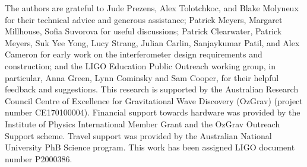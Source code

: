 \documentclass[aps,pra,superscriptaddress,reprint,nofootinbib]{revtex4-1}
\begin{document}
\begin{acknowledgments}
The authors are grateful to Jude Prezens, Alex Tolotchkoc, and Blake Molyneux for their technical advice and generous assistance; Patrick Meyers, Margaret Millhouse, Sofia Suvorova for useful discussions; Patrick Clearwater, Patrick Meyers, Suk Yee Yong, Lucy Strang, Julian Carlin, Sanjaykumar Patil, and Alex Cameron for early work on the interferometer design requirements and construction; and the LIGO Education Public Outreach working group, in particular, Anna Green, Lynn Cominsky and Sam Cooper, for their helpful feedback and suggestions.  
This research is supported by the Australian Research Council Centre of Excellence for Gravitational Wave Discovery (OzGrav) (project number CE170100004). 
Financial support towards hardware was provided by the Institute of Physics International Member Grant and the OzGrav Outreach Support scheme. 
Travel support was provided by the Australian National University PhB Science program.
This work has been assigned LIGO document number P2000386. 

\end{acknowledgments}


\appendix



\nocite{*}


\end{document}
